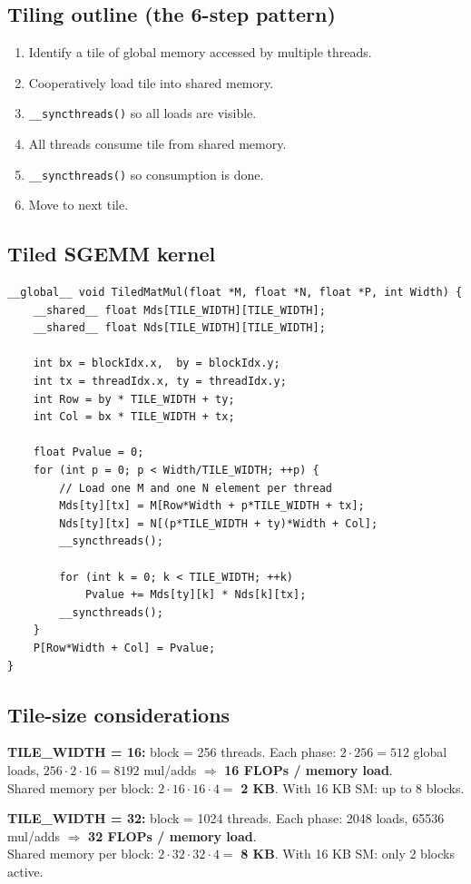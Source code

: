 \documentclass[10pt]{article}
\begin{document}
\subsection*{Tiling outline (the 6-step pattern)}
\begin{enumerate}
  \item Identify a tile of global memory accessed by multiple threads.
  \item Cooperatively load tile into shared memory.
  \item \texttt{\_\_syncthreads()} so all loads are visible.
  \item All threads consume tile from shared memory.
  \item \texttt{\_\_syncthreads()} so consumption is done.
  \item Move to next tile.
\end{enumerate}

\subsection*{Tiled SGEMM kernel}
\begin{lstlisting}
__global__ void TiledMatMul(float *M, float *N, float *P, int Width) {
    __shared__ float Mds[TILE_WIDTH][TILE_WIDTH];
    __shared__ float Nds[TILE_WIDTH][TILE_WIDTH];

    int bx = blockIdx.x,  by = blockIdx.y;
    int tx = threadIdx.x, ty = threadIdx.y;
    int Row = by * TILE_WIDTH + ty;
    int Col = bx * TILE_WIDTH + tx;

    float Pvalue = 0;
    for (int p = 0; p < Width/TILE_WIDTH; ++p) {
        // Load one M and one N element per thread
        Mds[ty][tx] = M[Row*Width + p*TILE_WIDTH + tx];
        Nds[ty][tx] = N[(p*TILE_WIDTH + ty)*Width + Col];
        __syncthreads();

        for (int k = 0; k < TILE_WIDTH; ++k)
            Pvalue += Mds[ty][k] * Nds[k][tx];
        __syncthreads();
    }
    P[Row*Width + Col] = Pvalue;
}
\end{lstlisting}

\subsection*{Tile-size considerations}
\begin{keybox}
\textbf{TILE\_WIDTH = 16:} block = 256 threads. Each phase: $2\cdot 256 = 512$ global loads, $256\cdot 2\cdot 16 = 8192$ mul/adds $\Rightarrow$ \textbf{16 FLOPs / memory load}.\\
Shared memory per block: $2 \cdot 16 \cdot 16 \cdot 4 = $ \textbf{2 KB}. With 16 KB SM: up to 8 blocks.

\textbf{TILE\_WIDTH = 32:} block = 1024 threads. Each phase: 2048 loads, 65536 mul/adds $\Rightarrow$ \textbf{32 FLOPs / memory load}.\\
Shared memory per block: $2 \cdot 32 \cdot 32 \cdot 4 = $ \textbf{8 KB}. With 16 KB SM: only 2 blocks active.
\end{keybox}
\end{document}

